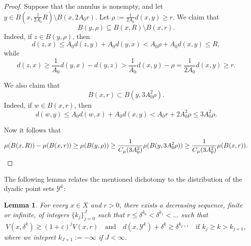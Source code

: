 \documentclass{amsart}
\numberwithin{equation}{section}
\theoremstyle{plain}
\newtheorem{lemma}[equation]{Lemma}
\theoremstyle{definition}
\theoremstyle{remark}
\begin{document}
{{{\begin{proof}
Suppose that the annulus is nonempty, and let $y\in B(x,\frac{1}{2A_{0}}R)\setminus B(x,2A_{0}r)$. Let $\rho:=\frac{1}{2A_{0}}d(x,y)\geq r$. We claim that
\begin{equation*}
  B(y,\rho)\subseteq B(x,R)\setminus B(x,r).
\end{equation*}
Indeed, if $z\in B(y,\rho)$, then
\begin{equation*}
  d(z,x)\leq A_{0}d(z,y)+A_{0}d(y,x)<A_0\rho+A_{0}d(x,y)\leq R,
\end{equation*}
while
\begin{equation*}
  d(z,x)\geq\frac{1}{A_{0}}d(y,x)-d(y,z)>\frac{1}{A_{0}}d(x,y)-\rho=\frac{1}{2A_{0}}d(x,y)\geq r.
\end{equation*}

We also claim that
\begin{equation*}
  B(x,r)\subset B(y,3A_{0}^2 \rho).
\end{equation*}
Indeed, if $w\in B(x,r)$, then
\begin{equation*}
  d(w,y)\leq A_{0}d(w,x)+A_{0}d(x,y)<A_{0}r+2A_{0}^2\rho\leq 3A_{0}^2\rho.
\end{equation*}

Now it follows that
\begin{equation*}
  \mu(B(x,R))-\mu(B(x,r))
  \geq\mu(B(y,\rho))
  \geq\frac{1}{C_\mu(3A_{0}^2)}\mu(B(y,3A_{0}^2\rho))
  \geq\frac{1}{C_\mu(3A_{0}^2)}\mu(B(x,r)).\qedhere
\end{equation*}
\end{proof}

The following lemma relates the mentioned dichotomy to the distribution of the dyadic point sets $\mathscr{Y}^k$:
  
\begin{lemma}\label{lem:kjSeq}
For every $x\in X$ and $r>0$, there exists a decreasing sequence, finite or infinite, of integers $\{k_j\}_{j=0}^J$ such that $r\leq\delta^{k_0}<\delta^{k_1}<\ldots$ such that
\begin{equation*}
  V(x,\delta^k)\gtrsim(1+\varepsilon)^j V(x,r)\quad\text{and}\quad
  d(x,\mathscr{Y}^k)+\delta^k\gtrsim\delta^{k_{j+1}}\quad\text{if }k_j\geq k>k_{j+1},
\end{equation*}
where we intepret $k_{J+1}:=-\infty$ if $J<\infty$.
\end{lemma}

}}}
\end{document}
